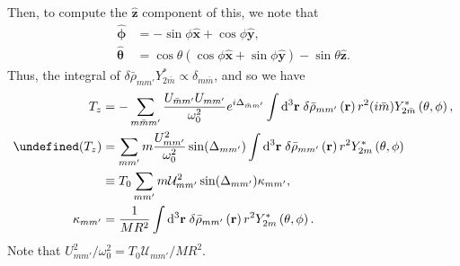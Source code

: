 \documentclass[12pt]{article}
\newcommand*{\bm}[1]{\boldsymbol{\mathbf{#1}}}
\newcommand*{\uv}[1]{\hat{\bm{#1}}}
\newcommand*{\p}[1]{\left(#1\right)}
\let\Re\undefined
\DeclareMathOperator{\Re}{Re}
\begin{document}
Then, to compute the $\uv{z}$ component of this, we note that
\begin{align}
    \uv{\phi} &= -\sin\phi \uv{x} + \cos\phi \uv{y},\\
    \uv{\theta} &= \cos\theta\p{\cos\phi \uv{x} + \sin\phi \uv{y}} -
        \sin\theta\uv{z}.
\end{align}
Thus, the integral of $\delta \bar{\rho}_{mm'}Y_{2\bar{m}}^* \propto
\delta_{m\bar{m}}$, and so we have
\begin{align}
    T_z
        &=
            -\sum\limits_{m\bar{m}m'}
            \frac{U_{\bar{m}m'}U_{mm'}}{\omega_0^2}
            e^{i\Delta_{\bar{m}m'}}
            \int\limits\mathrm{d}^3\bm{r}\;
                \delta\bar{\rho}_{mm'}\p{\bm{r}}
                r^2
                (i\bar{m})Y^*_{2\bar{m}}\p{\theta, \phi},\\
    \Re (T_z)
        &=
            \sum\limits_{mm'}
            m
            \frac{U_{mm'}^2}{\omega_0^2}
            \sin (\Delta_{mm'})
            \int\limits\mathrm{d}^3\bm{r}\;
                \delta\bar{\rho}_{mm'}\p{\bm{r}}
                r^2
                Y^*_{2m}\p{\theta, \phi}\nonumber\\
        &\equiv
            T_0
            \sum\limits_{mm'}
            m
            \mathcal{U}_{mm'}^2
            \sin (\Delta_{mm'})
            \kappa_{mm'},\\
    \kappa_{mm'}
        &=
            \frac{1}{MR^2}
            \int\limits\mathrm{d}^3\bm{r}\;
                \delta\bar{\rho}_{mm'}\p{\bm{r}}
                r^2
                Y^*_{2m}\p{\theta, \phi}.
\end{align}
Note that $U^2_{mm'} / \omega_0^2 = T_0 \mathcal{U}_{mm'} / MR^2$.
\end{document}
